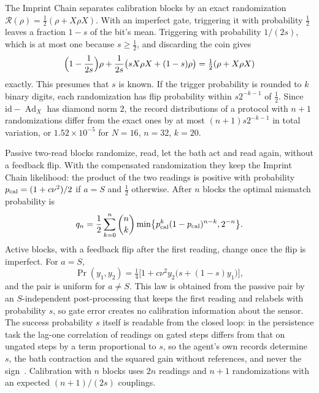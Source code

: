 \documentclass[aps,pre,onecolumn,superscriptaddress,floatfix,longbibliography]{revtex4-2}
\begin{document}
The Imprint Chain separates calibration blocks by an exact randomization $\mathcal R(\rho)=\tfrac12(\rho+X\rho X)$. With an imperfect gate, triggering it with probability $\tfrac12$ leaves a fraction $1-s$ of the bit's mean. Triggering with probability $1/(2s)$, which is at most one because $s\ge\tfrac12$, and discarding the coin gives
\begin{equation}
\Bigl(1-\frac1{2s}\Bigr)\rho+\frac1{2s}\bigl(sX\rho X+(1-s)\rho\bigr)=\tfrac12(\rho+X\rho X)
\end{equation}
exactly. This presumes that $s$ is known. If the trigger probability is rounded to $k$ binary digits, each randomization has flip probability within $s2^{-k-1}$ of $\tfrac12$. Since $\mathrm{id}-\operatorname{Ad}_X$ has diamond norm $2$, the record distributions of a protocol with $n+1$ randomizations differ from the exact ones by at most $(n+1)s2^{-k-1}$ in total variation, or $1.52\times10^{-5}$ for $N=16$, $n=32$, $k=20$.

Passive two-read blocks randomize, read, let the bath act and read again, without a feedback flip. With the compensated randomization they keep the Imprint Chain likelihood: the product of the two readings is positive with probability $p_{\rm cal}=(1+c\nu^2)/2$ if $a=S$ and $\tfrac12$ otherwise. After $n$ blocks the optimal mismatch probability is
\begin{equation}
q_n=\frac12\sum_{k=0}^n\binom nk\min\bigl\{p_{\rm cal}^k(1-p_{\rm cal})^{n-k},2^{-n}\bigr\}.
\label{eq:qn}
\end{equation}
Active blocks, with a feedback flip after the first reading, change once the flip is imperfect. For $a=S$,
\begin{equation}
\Pr(y_1,y_2)=\tfrac14\bigl[1+c\nu^2y_2\bigl(s+(1-s)y_1\bigr)\bigr],
\end{equation}
and the pair is uniform for $a\ne S$. This law is obtained from the passive pair by an $S$-independent post-processing that keeps the first reading and relabels with probability $s$, so gate error creates no calibration information about the sensor. The success probability $s$ itself is readable from the closed loop: in the persistence task the lag-one correlation of readings on gated steps differs from that on ungated steps by a term proportional to $s$, so the agent's own records determine $s$, the bath contraction and the squared gain without references, and never the sign~\cite{Liu2026TDOME_III}. Calibration with $n$ blocks uses $2n$ readings and $n+1$ randomizations with an expected $(n+1)/(2s)$ couplings.
\end{document}
